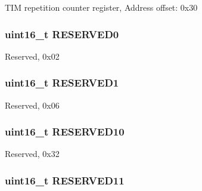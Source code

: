T\-I\-M repetition counter register, Address offset\-: 0x30 \hypertarget{struct_t_i_m___type_def_a149feba01f9c4a49570c6d88619f504f}{
\subsubsection[{R\-E\-S\-E\-R\-V\-E\-D0}]{\setlength{\rightskip}{0pt plus 5cm}uint16\-\_\-t R\-E\-S\-E\-R\-V\-E\-D0}}\label{struct_t_i_m___type_def_a149feba01f9c4a49570c6d88619f504f}
Reserved, 0x02 \hypertarget{struct_t_i_m___type_def_a8249a3955aace28d92109b391311eb30}{
\subsubsection[{R\-E\-S\-E\-R\-V\-E\-D1}]{\setlength{\rightskip}{0pt plus 5cm}uint16\-\_\-t R\-E\-S\-E\-R\-V\-E\-D1}}\label{struct_t_i_m___type_def_a8249a3955aace28d92109b391311eb30}
Reserved, 0x06 \hypertarget{struct_t_i_m___type_def_ad68efe7a323ac2fcb823a26c0c51445b}{
\subsubsection[{R\-E\-S\-E\-R\-V\-E\-D10}]{\setlength{\rightskip}{0pt plus 5cm}uint16\-\_\-t R\-E\-S\-E\-R\-V\-E\-D10}}\label{struct_t_i_m___type_def_ad68efe7a323ac2fcb823a26c0c51445b}
Reserved, 0x32 \hypertarget{struct_t_i_m___type_def_a11e504ee49142f46dcc67740ae9235e5}{
\subsubsection[{R\-E\-S\-E\-R\-V\-E\-D11}]{\setlength{\rightskip}{0pt plus 5cm}uint16\-\_\-t R\-E\-S\-E\-R\-V\-E\-D11}}\label{struct_t_i_m___type_def_a11e504ee49142f46dcc67740ae9235e5}
